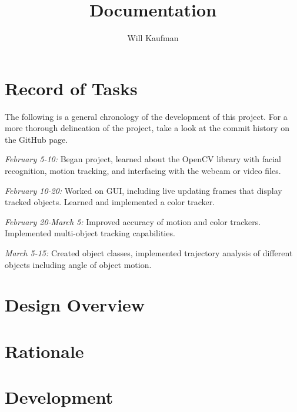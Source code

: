 \documentclass[11pt]{article}
\begin{document}
\title{Documentation}
\author{Will Kaufman}
\maketitle

\section{Record of Tasks}
The following is a general chronology of the development of this project.  For a more thorough delineation of the project, take a look at the commit history on the GitHub page.

\emph{February 5-10:} Began project, learned about the OpenCV library with facial recognition, motion tracking, and interfacing with the webcam or video files.

\emph{February 10-20:} Worked on GUI, including live updating frames that display tracked objects.  Learned and implemented a color tracker.

\emph{February 20-March 5:} Improved accuracy of motion and color trackers.  Implemented multi-object tracking capabilities.

\emph{March 5-15:} Created object classes, implemented trajectory analysis of different objects including angle of object motion.

\section{Design Overview}

\section{Rationale}

\section{Development}
\end{document}
